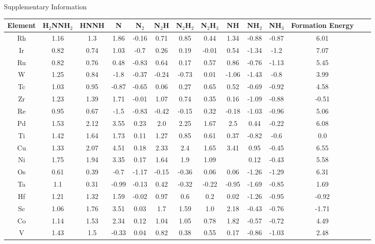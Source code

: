 Supplementary Information
\onecolumn
\begin{table}
\begin{center}
\begin{tabular}{| c | c | c | c | c | c | c | c | c | c | c | c | c | c |}
\hline
Element & H$_2$NNH$_2$ & HNNH & N & N$_2$ & N$_2$H & N$_2$H$_2$ & N$_2$H$_3$ & NH & NH$_2$ & NH$_3$ & Formation Energy\\
\hline

Rh & 1.16 & 1.3 & 1.86 & -0.16 & 0.71 & 0.85 & 0.44 & 1.34 & -0.88 & -0.87 & 6.01 \\
Ir & 0.82 & 0.74 & 1.03 & -0.7 & 0.26 & 0.19 & -0.01 & 0.54 & -1.34 & -1.2 & 7.07 \\
Ru & 0.82 & 0.76 & 0.48 & -0.83 & 0.64 & 0.17 & 0.57 & 0.86 & -0.76 & -1.13 & 5.45 \\
W & 1.25 & 0.84 & -1.8 & -0.37 & -0.24 & -0.73 & 0.01 & -1.06 & -1.43 & -0.8 & 3.99 \\
Tc & 1.03 & 0.95 & -0.87 & -0.65 & 0.06 & 0.27 & 0.65 & 0.52 & -0.69 & -0.92 & 4.58 \\
Zr & 1.23 & 1.39 & 1.71 & -0.01 & 1.07 & 0.74 & 0.35 & 0.16 & -1.09 & -0.88 & -0.51 \\
Re & 0.95 & 0.67 & -1.5 & -0.83 & -0.42 & -0.15 & 0.32 & -0.18 & -1.03 & -0.96 & 5.06 \\
Pd & 1.53 & 2.12 & 3.55 & 0.23 & 2.0 & 2.25 & 1.67 & 2.5 & 0.44 & -0.22 & 6.08 \\
Ti & 1.42 & 1.64 & 1.73 & 0.11 & 1.27 & 0.85 & 0.61 & 0.37 & -0.82 & -0.6 & 0.0 \\
Cu & 1.33 & 2.07 & 4.51 & 0.18 & 2.33 & 2.4 & 1.65 & 3.41 & 0.95 & -0.45 & 6.55 \\
Ni & 1.75 & 1.94 & 3.35 & 0.17 & 1.64 & 1.9 & 1.09 &  & 0.12 & -0.43 & 5.58 \\
Os & 0.61 & 0.39 & -0.7 & -1.17 & -0.15 & -0.36 & 0.06 & 0.06 & -1.26 & -1.29 & 6.31 \\
Ta & 1.1 & 0.31 & -0.99 & -0.13 & 0.42 & -0.32 & -0.22 & -0.95 & -1.69 & -0.85 & 1.69 \\
Hf & 1.21 & 1.32 & 1.59 & -0.02 & 0.97 & 0.6 & 0.2 & 0.02 & -1.26 & -0.95 & -0.92 \\
Sc & 1.06 & 1.76 & 3.51 & 0.03 & 1.7 & 1.59 & 1.0 & 2.18 & -0.43 & -0.76 & -1.71 \\
Co & 1.14 & 1.53 & 2.34 & 0.12 & 1.04 & 1.05 & 0.78 & 1.82 & -0.57 & -0.72 & 4.49 \\
V & 1.43 & 1.5 & -0.33 & 0.04 & 0.82 & 0.38 & 0.55 & 0.17 & -0.86 & -1.03 & 2.48 \\

\end{tabular}
\end{center}
\end{table}
